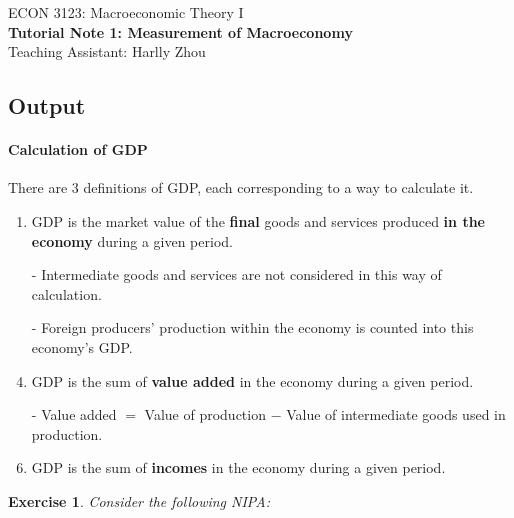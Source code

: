 \documentclass[12pt]{article}
\newtheorem{exercise}{Exercise}
\numberwithin{equation}{section}
\begin{document}
\begin{center}
    ECON 3123: Macroeconomic Theory I\\
    {\large \textbf{Tutorial Note 1: Measurement of Macroeconomy}}\\
    Teaching Assistant: Harlly Zhou
\end{center}

\subsection*{Output}
\paragraph{Calculation of GDP}
There are 3 definitions of GDP, each corresponding to a way to calculate it.
\begin{enumerate}[label=(\arabic*)]
    \item GDP is the market value of the \textbf{final} goods and services produced \textbf{in the economy} during a given period.
    \item[-] Intermediate goods and services are not considered in this way of calculation.
    \item[-] Foreign producers' production within the economy is counted into this economy's GDP.
    
    \item GDP is the sum of \textbf{value added} in the economy during a given period.
    \item[-] Value added $=$ Value of production $-$ Value of intermediate goods used in production.

    \item GDP is the sum of \textbf{incomes} in the economy during a given period.
\end{enumerate}

\begin{exercise}
    Consider the following NIPA:
\end{exercise}
\end{document}
